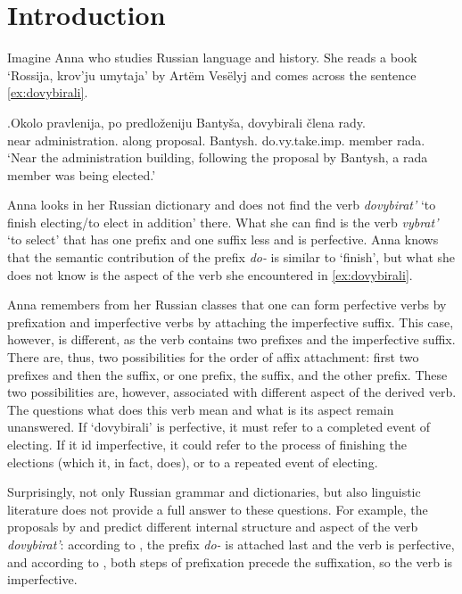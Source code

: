 
\chapter{Introduction} %
\label{Chapter1}
Imagine Anna who studies Russian language and history. She reads a book `Rossija, krov'ju umytaja' by Art\"{e}m Ves\"{e}lyj  and comes across the sentence \ref{ex:dovybirali}.

\exg.\label{ex:dovybirali}Okolo pravlenija, po predlo\v{z}eniju Banty\v{s}a, dovybirali \v{c}lena rady.\\
near administration. along proposal. Bantysh. do.vy.take.imp. member rada.\\
\vspace{0.3em}
`Near the administration building, following the proposal by Bantysh, a rada member was being elected.'

Anna looks in her Russian dictionary and does not find the verb \textit{dovybirat'} `to finish electing/to elect in addition' there.  What she can find is the verb \textit{vybrat'} `to select'  that has one prefix and one suffix less and is perfective. Anna knows that the semantic contribution of the prefix \textit{do-} is similar to `finish', but what she does not know is the aspect of the verb she encountered in \ref{ex:dovybirali}. 

Anna remembers from her Russian classes that one can form perfective verbs by prefixation and imperfective verbs by attaching the imperfective suffix. This case, however, is different, as the verb contains two prefixes and the imperfective suffix. There are, thus, two possibilities for the order of affix attachment: first two prefixes and then the suffix, or one prefix, the suffix, and the other prefix. These two possibilities are, however, associated with different aspect of the derived verb. The questions what does this verb mean and what is its aspect remain unanswered. If `dovybirali' is perfective, it must refer to a completed event of electing. If it id imperfective, it could refer to the process of finishing the elections (which it, in fact, does), or to a repeated event of electing. 

Surprisingly, not only Russian grammar and dictionaries, but also linguistic literature does not provide a full answer to these questions. For example, the proposals by \citet{Svenonius:04b} and \citet{Tatevosov:07} predict different internal structure and aspect of the verb \textit{dovybirat'}: according to \citet{Svenonius:04b}, the prefix \textit{do-} is attached last and the verb is perfective, and according to \citet{Tatevosov:07}, both steps of prefixation precede the suffixation, so the verb is imperfective.

